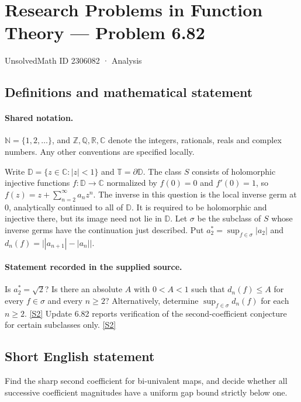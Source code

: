 \documentclass[11pt]{article}
\newcommand{\sref}[2]{\hyperlink{source:#1:#2}{[S#2]}}
\begin{document}
\setcounter{section}{2306081}
\section{Research Problems in Function Theory — Problem 6.82}\label{2306082}
{\small\sffamily UnsolvedMath ID 2306082 · Analysis}
\subsection{Definitions and mathematical statement}

\paragraph{Shared notation.}$\mathbb N=\{1,2,\ldots\}$, and $\mathbb Z,\mathbb Q,\mathbb R,\mathbb C$ denote the integers, rationals, reals and complex numbers. Any other conventions are specified locally.


Write $\mathbb D=\{z\in\mathbb C:|z|<1\}$ and $\mathbb T=\partial\mathbb D$. The class $S$ consists of holomorphic injective functions $f:\mathbb D\to\mathbb C$ normalized by $f(0)=0$ and $f'(0)=1$, so $f(z)=z+\sum_{n=2}^{\infty}a_nz^n$. The inverse in this question is the local inverse germ at $0$, analytically continued to all of $\mathbb D$. It is required to be holomorphic and injective there, but its image need not lie in $\mathbb D$. Let $\sigma$ be the subclass of $S$ whose inverse germs have the continuation just described. Put $a_2^*=\sup_{f\in\sigma}|a_2|$ and $d_n(f)=\bigl||a_{n+1}|-|a_n|\bigr|$.
\paragraph{Statement recorded in the supplied source.}
Is $a_2^*=\sqrt2$? Is there an absolute $A$ with $0<A<1$ such that $d_n(f)\le A$ for every $f\in\sigma$ and every $n\ge2$? Alternatively, determine $\sup_{f\in\sigma}d_n(f)$ for each $n\ge2$. \sref{2306082}{2}
Update 6.82 reports verification of the second-coefficient conjecture for certain subclasses only. \sref{2306082}{2}
\subsection{Short English statement}
Find the sharp second coefficient for bi-univalent maps, and decide whether all successive coefficient magnitudes have a uniform gap bound strictly below one.
\end{document}
